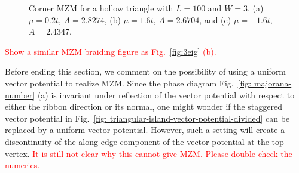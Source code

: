 \documentclass[aps,prb,showpacs,amsmath,twocolumn,amssymb,superscriptaddress]{revtex4-2}
\newcommand{\Red}[1]{\textcolor{red}{#1}}
\begin{document}
\begin{figure}[ht]
  \caption{Corner MZM for a hollow triangle with $L=100$ and $W=3$. (a) $\mu=0.2t$, $A = 2.8274$, (b) $\mu=1.6t$, $A = 2.6704$, and (c) $\mu=-1.6t$, $A = 2.4347$.}
  \label{fig: mzm-wavefunctions}
\end{figure}
\twocolumngrid


\Red{Show a similar MZM braiding figure as Fig.~\ref{fig:3eig} (b).}

Before ending this section, we comment on the possibility of using a uniform vector potential to realize MZM. Since the phase diagram Fig.~\ref{fig: majorana-number} (a) is invariant under reflection of the vector potential with respect to either the ribbon direction or its normal, one might wonder if the staggered vector potential in Fig.~\ref{fig: triangular-island-vector-potential-divided} can be replaced by a uniform vector potential. However, such a setting will create a discontinuity of the along-edge component of the vector potential at the top vertex. \Red{It is still not clear why this cannot give MZM. Please double check the numerics.}
\end{document}
